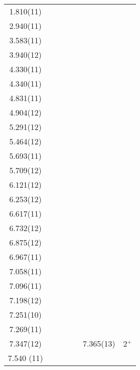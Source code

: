 \begin{center}
\begin{longtable}{cc c cc cc}
1.810(11)   &       &       &       &       &       &       \\
2.940(11)   &       &       &       &       &       &       \\
3.583(11)   &       &       &       &       &       &       \\
3.940(12)   &       &       &       &       &       &       \\
4.330(11)   &       &       &       &       &       &       \\
4.340(11)   &       &       &       &       &       &       \\
4.831(11)   &       &       &       &       &       &       \\
4.904(12)   &       &       &       &       &       &       \\
5.291(12)   &       &       &       &       &       &       \\
5.464(12)   &       &       &       &       &       &       \\
5.693(11)   &       &       &       &       &       &       \\
5.709(12)   &       &       &       &       &       &       \\
6.121(12)   &       &       &       &       &       &       \\
6.253(12)   &       &       &       &       &       &       \\
6.617(11)   &       &       &       &       &       &       \\
6.732(12)   &       &       &       &       &       &       \\
6.875(12)   &       &       &       &       &       &       \\
6.967(11)   &       &       &       &       &       &       \\
7.058(11)   &       &       &       &       &       &       \\
7.096(11)   &       &       &       &       &       &       \\
7.198(12)   &       &       &       &       &       &       \\
7.251(10)   &       &       &       &       &       &       \\
7.269(11)   &       &       &       &       &       &       \\
7.347(12)   &       &       &       &       &    7.365(13)      &          2$^+$            \\
  7.540 (11)    &       &       &       &       &       &       \\

\end{longtable}
\end{center}
